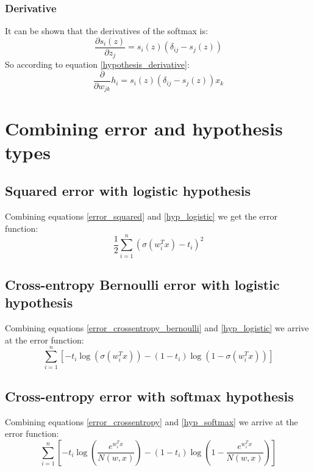 \documentclass[12pt, a4paper]{article}
\numberwithin{equation}{section}
\begin{document}
\subsubsection{Derivative}
It can be shown that the derivatives of the softmax is:
\begin{equation}
\frac{\partial s_i(z)}{\partial z_j}=s_i(z)(\delta_{ij}-s_j(z))
\end{equation}
So according to equation \ref{hypothesis_derivative}:
\begin{equation}
\frac{\partial}{\partial w_{jk}}h_i=s_i(z)(\delta_{ij}-s_j(z))x_k
\end{equation}

\section{Combining error and hypothesis types}

\subsection{Squared error with logistic hypothesis}
Combining equations \ref{error_squared} and \ref{hyp_logistic} we get the error function:
\begin{equation}
\frac{1}{2}\sum_{i=1}^n(\sigma(w_i^T x)-t_i)^2
\end{equation}

\subsection{Cross-entropy Bernoulli error with logistic hypo\-thesis}
Combining equations \ref{error_crossentropy_bernoulli} and \ref{hyp_logistic} we arrive at the error function:
\begin{equation}
\sum_{i=1}^n\left[-t_i\log(\sigma(w_i^T x))-(1-t_i)\log(1-\sigma(w_i^T x))\right]
\end{equation}

\subsection{Cross-entropy error with softmax hypothesis}
Combining equations \ref{error_crossentropy} and \ref{hyp_softmax} we arrive at the error function:
\begin{equation}
\sum_{i=1}^n\left[-t_i\log\left(\frac{e^{w_i^T x}}{N(w,x)}\right)-(1-t_i)\log\left(1-\frac{e^{w_i^T x}}{N(w,x)}\right)\right]
\end{equation}
\end{document}
